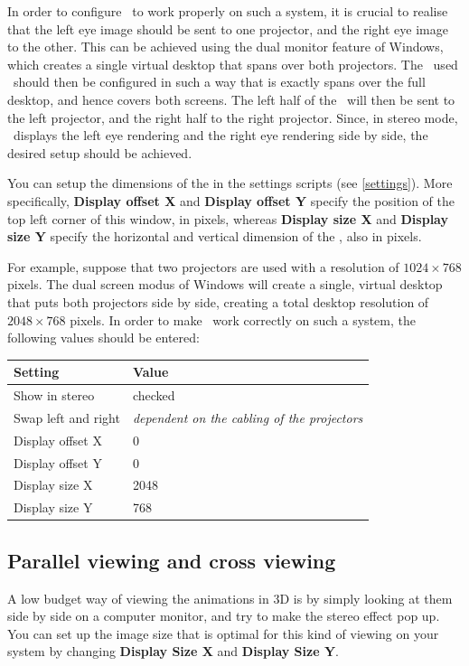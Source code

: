 In order to configure \softwarename\ to work properly on such a system, it is crucial to realise that the left eye image should be sent to one projector, and the right eye image to the other. This can be achieved using the dual monitor feature of Windows, which creates a single virtual desktop that spans over both projectors. The \renderwin\ used \softwarename\ should then be configured in such a way that is exactly spans over the full desktop, and hence covers both screens. The left half of the \renderwin\ will then be sent to the left projector, and the right half to the right projector. Since, in stereo mode, \softwarename\ displays the left eye rendering and the right eye rendering side by side, the desired setup should be achieved.

You can setup the dimensions of the \renderwin in the settings scripts (see \ref{settings}). More specifically, \textbf{Display offset X} and \textbf{Display offset Y} specify the position of the top left corner of this window, in pixels, whereas \textbf{Display size X} and \textbf{Display size Y} specify the horizontal and vertical dimension of the \renderwin, also in pixels.

For example, suppose that two projectors are used with a resolution of $1024 \times 768$ pixels. The dual screen modus of Windows will create a single, virtual desktop that puts both projectors side by side, creating a total desktop resolution of $2048 \times 768$ pixels. In order to make \softwarename\ work correctly on such a system, the following values should be entered:

\begin{tabular}{l l}
\hline
Setting & Value \\ \hline
Show in stereo & checked \\
Swap left and right & \textit{dependent on the cabling of the projectors} \\
Display offset X & 0 \\
Display offset Y & 0 \\
Display size X & 2048 \\
Display size Y & 768 \\
\hline
\end{tabular}

\subsection{Parallel viewing and cross viewing}
A low budget way of viewing the animations in 3D is by simply looking at them side by side on a computer monitor, and try to make the stereo effect pop up. You can set up the image size that is optimal for this kind of viewing on your system by changing \textbf{Display Size X} and \textbf{Display Size Y}.

